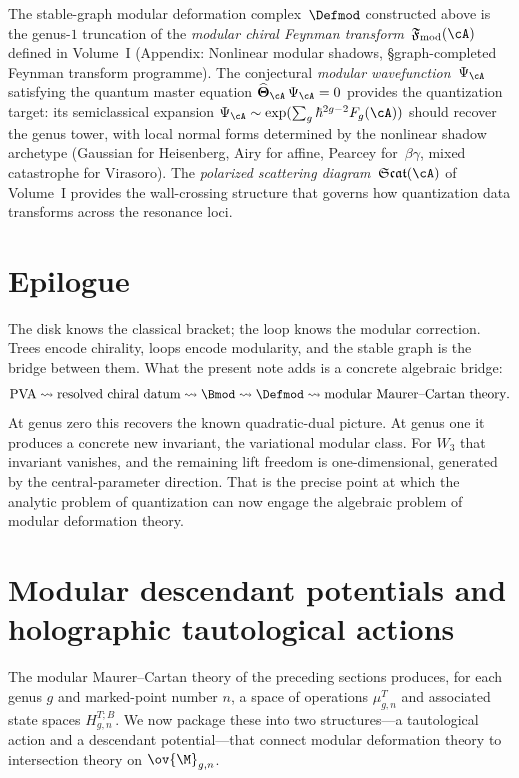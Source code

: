 \begin{remark}
\label{rem:modular-wavefunction-connection}
The stable-graph modular deformation complex~$\Defmod$ constructed above
is the genus-$1$ truncation of the \emph{modular chiral Feynman
transform}~$\mathfrak{F}_{\mathrm{mod}}(\cA)$ defined in
Volume~I (Appendix: Nonlinear modular shadows,
\S\textup{graph-completed Feynman transform programme}).
The conjectural \emph{modular wavefunction}~$\Psi_\cA$ satisfying the
quantum master equation $\widehat{\boldsymbol\Theta}_\cA\,\Psi_\cA=0$
provides the quantization target: its semiclassical expansion
$\Psi_\cA \sim \exp(\sum_{g} \hbar^{2g-2} F_g(\cA))$ should recover
the genus tower, with local normal forms determined by the nonlinear
shadow archetype (Gaussian for Heisenberg, Airy for affine,
Pearcey for~$\beta\gamma$, mixed catastrophe for Virasoro).
The \emph{polarized scattering diagram}~$\mathfrak{Scat}(\cA)$ of
Volume~I provides the wall-crossing structure that governs how
quantization data transforms across the resonance loci.
\end{remark}

\section*{Epilogue}

The disk knows the classical bracket; the loop knows the modular correction. Trees encode
chirality, loops encode modularity, and the stable graph is the bridge between them.
What the present note adds is a concrete algebraic bridge:
\[
\text{PVA}
\rightsquigarrow
\text{resolved chiral datum}
\rightsquigarrow
\Bmod
\rightsquigarrow
\Defmod
\rightsquigarrow
\text{modular Maurer--Cartan theory}.
\]
At genus zero this recovers the known quadratic-dual picture. At genus one it produces
a concrete new invariant, the variational modular class. For $W_3$ that invariant vanishes,
and the remaining lift freedom is one-dimensional, generated by the central-parameter
direction. That is the precise point at which the analytic problem of quantization can
now engage the algebraic problem of modular deformation theory.

\section{Modular descendant potentials and holographic tautological actions}
\label{sec:modular-descendant-potentials}

The modular Maurer--Cartan theory of the preceding sections produces, for each genus $g$
and marked-point number $n$, a space of operations $\mu_{g,n}^T$ and associated state
spaces $H_{g,n}^{T;B}$.  We now package these into two structures---a tautological action
and a descendant potential---that connect modular deformation theory to intersection
theory on $\ov{\M}_{g,n}$.

